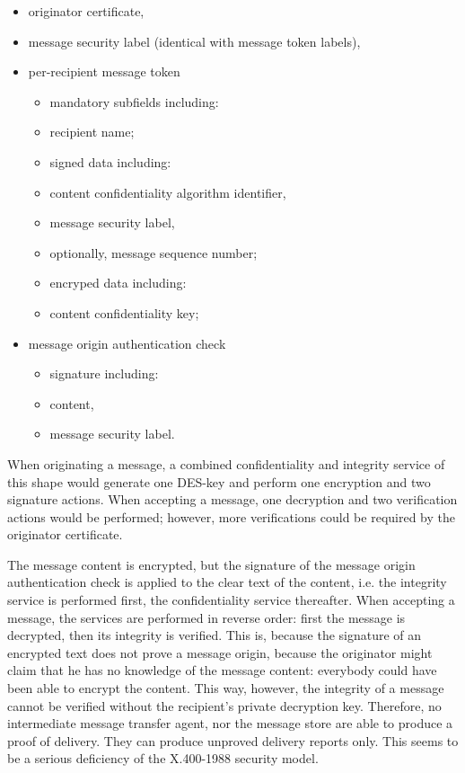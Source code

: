 \begin{itemize}
\item originator certificate,
\item message security label (identical with message token labels),
\item per-recipient message token
\begin{itemize}
\item mandatory subfields including:
\item recipient name;
\item signed data including:
\item content confidentiality algorithm identifier,
\item message security label,
\item optionally, message sequence number;
\item encryped data including:
\item content confidentiality key;
\end{itemize}
\item message origin authentication check
\begin{itemize}
\item signature including:
\item content,
\item message security label.
\end{itemize}
\end{itemize}

When originating a message,
a combined confidentiality and integrity service of this shape would
generate one DES-key and
perform one encryption and two signature actions.
When accepting a message,
one decryption and two verification actions would be performed;
however, more verifications could be required by the originator certificate.

The message content is encrypted, but the signature of the
message origin authentication check is applied to the
clear text of the content,
i.e. the integrity service is performed first, the
confidentiality service thereafter.
When accepting a message, the services are performed
in reverse order: first the message is decrypted,
then its integrity is verified.
This is, because the signature of an encrypted text does
not prove a message origin, because the originator might
claim that he has no knowledge of the message content:
everybody could have been able to encrypt the content.
This way, however,
the integrity of a message cannot be verified
without the recipient's private decryption key.
Therefore, no intermediate message transfer agent,
nor the message store are able to produce a proof of delivery.
They can produce unproved delivery reports only.
This seems to be a serious deficiency of the X.400-1988 security model.

